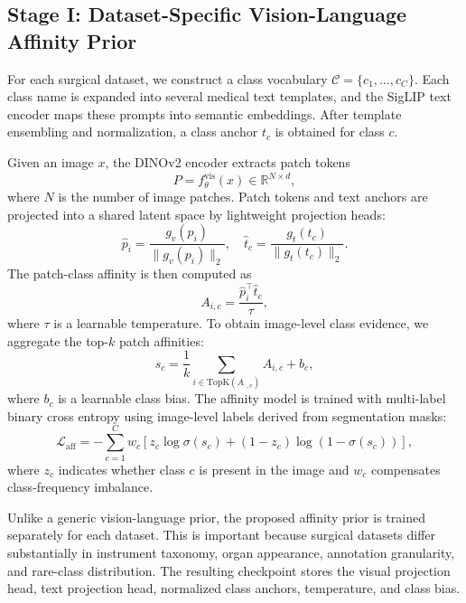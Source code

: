 \documentclass[journal,twoside]{IEEEtran}
\begin{document}
\subsection{Stage I: Dataset-Specific Vision-Language Affinity Prior}
For each surgical dataset, we construct a class vocabulary $\mathcal{C}=\{c_1,\ldots,c_C\}$. Each class name is expanded into several medical text templates, and the SigLIP text encoder maps these prompts into semantic embeddings. After template ensembling and normalization, a class anchor $t_c$ is obtained for class $c$.

Given an image $x$, the DINOv2 encoder extracts patch tokens
\begin{equation}
    P = f_{\theta}^{\mathrm{vis}}(x) \in \mathbb{R}^{N \times d},
\end{equation}
where $N$ is the number of image patches. Patch tokens and text anchors are projected into a shared latent space by lightweight projection heads:
\begin{equation}
    \hat{p}_i = \frac{g_v(p_i)}{\|g_v(p_i)\|_2}, \quad
    \hat{t}_c = \frac{g_t(t_c)}{\|g_t(t_c)\|_2}.
\end{equation}
The patch-class affinity is then computed as
\begin{equation}
    A_{i,c} = \frac{\hat{p}_i^\top \hat{t}_c}{\tau},
\end{equation}
where $\tau$ is a learnable temperature. To obtain image-level class evidence, we aggregate the top-$k$ patch affinities:
\begin{equation}
    s_c = \frac{1}{k}\sum_{i \in \mathrm{TopK}(A_{:,c})} A_{i,c} + b_c ,
\end{equation}
where $b_c$ is a learnable class bias. The affinity model is trained with multi-label binary cross entropy using image-level labels derived from segmentation masks:
\begin{equation}
    \mathcal{L}_{\mathrm{aff}} =
    -\sum_{c=1}^{C} w_c
    \left[z_c \log \sigma(s_c) + (1-z_c)\log(1-\sigma(s_c))\right],
\end{equation}
where $z_c$ indicates whether class $c$ is present in the image and $w_c$ compensates class-frequency imbalance.

Unlike a generic vision-language prior, the proposed affinity prior is trained separately for each dataset. This is important because surgical datasets differ substantially in instrument taxonomy, organ appearance, annotation granularity, and rare-class distribution. The resulting checkpoint stores the visual projection head, text projection head, normalized class anchors, temperature, and class bias.
\end{document}

